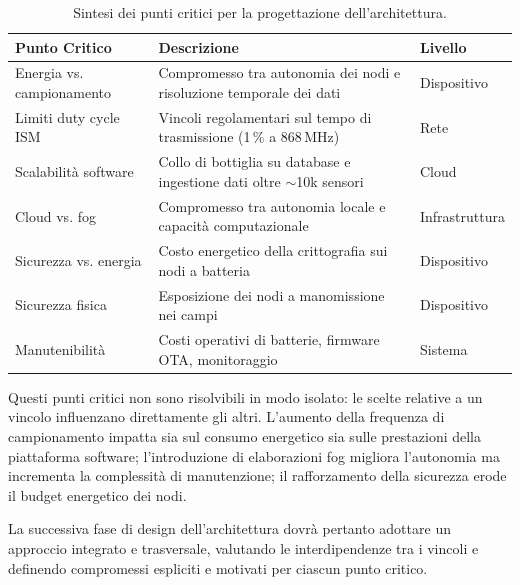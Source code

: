 \begin{table}[H]
	\centering
	\small
	\begin{tabularx}{\textwidth}{|l|X|l|}
		\hline
		\textbf{Punto Critico} & \textbf{Descrizione} & \textbf{Livello} \\
		\hline
		Energia vs. campionamento & Compromesso tra autonomia dei nodi e risoluzione temporale dei dati & Dispositivo \\
		\hline
		Limiti duty cycle ISM & Vincoli regolamentari sul tempo di trasmissione (1\,\% a 868\,MHz) & Rete \\
		\hline
		Scalabilità software & Collo di bottiglia su database e ingestione dati oltre $\sim$10k sensori & Cloud \\
		\hline
		Cloud vs. fog & Compromesso tra autonomia locale e capacità computazionale & Infrastruttura \\
		\hline
		Sicurezza vs. energia & Costo energetico della crittografia sui nodi a batteria & Dispositivo \\
		\hline
		Sicurezza fisica & Esposizione dei nodi a manomissione nei campi & Dispositivo \\
		\hline
		Manutenibilità & Costi operativi di batterie, firmware OTA, monitoraggio & Sistema \\
		\hline
	\end{tabularx}
	\caption{Sintesi dei punti critici per la progettazione dell'architettura.}
	\label{tab:punti_critici}
\end{table}

\noindent Questi punti critici non sono risolvibili in modo isolato: le scelte relative a un vincolo influenzano direttamente gli altri. L'aumento della frequenza di campionamento impatta sia sul consumo energetico sia sulle prestazioni della piattaforma software; l'introduzione di elaborazioni fog migliora l'autonomia ma incrementa la complessità di manutenzione; il rafforzamento della sicurezza erode il budget energetico dei nodi.

La successiva fase di design dell'architettura dovrà pertanto adottare un approccio integrato e trasversale, valutando le interdipendenze tra i vincoli e definendo compromessi espliciti e motivati per ciascun punto critico.